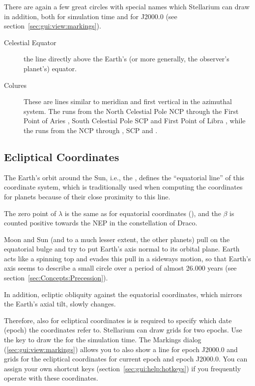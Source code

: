 There are again a few great circles with special names which
Stellarium can draw in addition, both for simulation time and for
J2000.0 (see section~\ref{sec:gui:view:markings}).
\begin{description}
\item[Celestial Equator] the line directly above the Earth's (or more
  generally, the observer's planet's) equator.
\item[Colures] These are lines similar to meridian and first vertical
  in the azimuthal system. The  runs from the
  North Celestial Pole NCP through the First Point of Aries \Aries,
  South Celestial Pole SCP and First Point of Libra \Libra, while the
   runs from the NCP through  \Cancer, SCP and  \Capricorn.
\end{description}

\subsection{Ecliptical Coordinates}
\label{sec:Concepts:Ecliptical}

The Earth's orbit around the Sun, i.e., the ,
defines the ``equatorial line'' of this coordinate system, which is traditionally used when computing the coordinates for planets because of their close proximity to this line.

The zero point of  $\lambda$ is the
same as for equatorial coordinates (\Aries), and the  $\beta$ is counted positive towards the
 NEP in the constellation of
Draco.

Moon and Sun (and to a much lesser extent, the other planets) pull on
the equatorial bulge and try to put Earth's axis normal to its orbital
plane. Earth acts like a spinning top and evades this pull in a
sideways motion, so that Earth's axis seems to describe a small circle
over a period of almost 26.000 years (see section~\ref{sec:Concepts:Precession}). 

In addition, ecliptic obliquity against the equatorial coordinates,
which mirrors the Earth's axial tilt, slowly changes.

Therefore, also for ecliptical coordinates is is required to specify
which date (epoch) the coordinates refer to.  Stellarium can draw grids
for two epochs. Use the \key{,} key to draw the 
for the simulation time. The Markings dialog
(\ref{sec:gui:view:markings}) allows you to also show a line for epoch
J2000.0 and grids for the ecliptical coordinates for current epoch and
epoch J2000.0. You can assign your own shortcut keys
(section~\ref{sec:gui:help:hotkeys}) if you frequently operate with
these coordinates.

